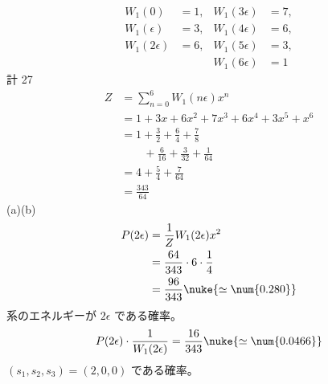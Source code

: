 \begin{align*}
W_{1}(0)&=1, & W_{1}(3\epsilon)&=7,\\
W_{1}(\epsilon)&=3, & W_{1}(4\epsilon)&=6,\\
W_{1}(2\epsilon)&=6, & W_{1}(5\epsilon)&=3,\\
& & W_{1}(6\epsilon)&=1
\end{align*}
計 27
\begin{align*}
Z&=\sum_{n=0}^{6}W_{1}(n\epsilon)x^{n}\\
&=1+3x+6x^{2}+7x^{3}+6x^{4}+3x^{5}+x^{6}\\
&=1+\frac{3}{2}+\frac{6}{4}+\frac{7}{8}\\
&\qquad+\frac{6}{16}+\frac{3}{32}+\frac{1}{64}\\
&=4+\frac{5}{4}+\frac{7}{64}\\
&=\frac{343}{64}
\end{align*}
(a)(b)
\begin{align*}
P(2\epsilon)&=\frac{1}{Z}W_{1}(2\epsilon)x^{2}\\
&=\frac{64}{343}\cdot6\cdot\frac{1}{4}\\
&=\frac{96}{343}\nuke{\simeq\num{0.280}}
\end{align*}
系のエネルギーが $2\epsilon$ である確率。
\[ P(2\epsilon)\cdot\frac{1}{W_{1}(2\epsilon)}=\frac{16}{343}\nuke{\simeq\num{0.0466}} \]
$(s_{1},s_{2},s_{3})=(2,0,0)$ である確率。

